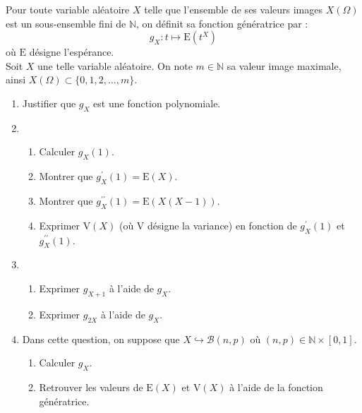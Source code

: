 \begin{exercice}%
Pour toute variable aléatoire $X$ telle que l'ensemble de ses valeurs images $X(\Omega)$ est un sous-ensemble fini de $\mathbb{N}$, on définit sa fonction génératrice par :
$$g_{X}: t \mapsto \mathrm{E}\left(t^{X}\right) $$ où $\mathrm{E}$ désigne l'espérance.\\
Soit $X$ une telle variable aléatoire. On note $m \in \mathbb{N}$ sa valeur image maximale, ainsi $X(\Omega) \subset\{0,1,2, \ldots, m\}$.

\begin{enumerate}
  \item Justifier que $g_{X}$ est une fonction polynomiale.
  \item 
 \begin{enumerate}
\item   Calculer $g_{X}(1)$.
\item Montrer que $g_{X}^{\prime}(1)=\mathrm{E}(X)$.
\item  Montrer que $g_{X}^{\prime \prime}(1)=\mathrm{E}(X(X-1))$.
\item  Exprimer $\mathrm{V}(X)$ (où $\mathrm{V}$ désigne la variance) en fonction de $g_{X}^{\prime}(1)$ et $g_{X}^{\prime \prime}(1)$. 
\end{enumerate}  

  \item
  
 \begin{enumerate}
  \item  Exprimer $g_{X+1}$ à l'aide de $g_{X}$.
\item  Exprimer $g_{2 X}$ à l'aide de $g_{X}$.
\end{enumerate}  
  \item Dans cette question, on suppose que $X \hookrightarrow \mathcal{B}(n, p)$ où $(n, p) \in \mathbb{N} \times[0,1]$.
  
  \begin{enumerate}
\item  Calculer $g_{X}$.
\item  Retrouver les valeurs de $\mathrm{E}(X)$ et $\mathrm{V}(X)$ à l'aide de la fonction   génératrice.
  \end{enumerate}

\end{enumerate}
\end{exercice}

